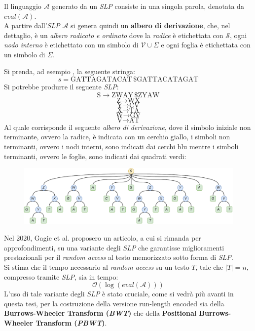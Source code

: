 Il linguaggio $\mathcal{A}$ generato da un \textit{SLP}
consiste in una singola parola, denotata da $eval(\mathcal{A})$. \\
A partire dall'\textit{SLP} $\mathcal{A}$ si genera quindi un \textbf{albero
  di derivazione}, che, nel dettaglio, è un \textit{albero radicato e ordinato}
dove la \textit{radice} è etichettata con $\mathcal{S}$, ogni \textit{nodo
  interno} è etichettato con un simbolo di $\mathcal{V}\cup\Sigma$ e ogni foglia
è etichettata con un simbolo di $\Sigma$.
\begin{esempio}
  \label{ese:slpgagie}
  Si prenda, ad esempio \cite{slpgagie}, la seguente stringa:
  \[s=\mbox{GATTAGATACAT}\,\$\mbox{GATTACATAGAT}\]
  Si potrebbe produrre il seguente \emph{SLP}:
  \[\mbox{S}\to \mbox{ZWAY}\,\$\mbox{ZYAW}\]
  \[\mbox{Z}\to \mbox{WX}\]
  \[\mbox{Y}\to \mbox{CV}\]
  \[\mbox{X}\to \mbox{TA}\]
  \[\mbox{W}\to \mbox{GV}\]
  \[\mbox{V}\to \mbox{AT}\]
  Al quale corrisponde il seguente \emph{albero di derivazione}, dove il simbolo
  iniziale non terminante, ovvero la radice, è indicata con un cerchio giallo, i
  simboli non terminanti, ovvero i nodi interni, sono indicati dai cerchi blu
  mentre i simboli terminanti, ovvero le foglie, sono indicati dai quadrati
  verdi:
  \begin{figure}[H]
    \centering
    \includegraphics[width=\textwidth]{img/slpgagie.pdf}
  \end{figure}
\end{esempio}
Nel 2020, Gagie et al. \cite{slpgagie} 
proposero un articolo, a cui si rimanda per approfondimenti, su una variante
degli \textit{SLP} che garantisse miglioramenti 
prestazionali per il \textit{random access} al testo memorizzato sotto forma di
\textit{SLP}.\\
Si stima che il tempo necessario al
\textit{random access} su un testo $T$, tale che $|T|=n$, compresso tramite
\textit{SLP}, sia in tempo:
\[\mathcal{O}\left(\log (eval(\mathcal{A}))\right)\]
L'uso di tale variante degli \textit{SLP} è stato cruciale, come si vedrà più
avanti in questa tesi, per la costruzione della versione run-length encoded sia
della \textbf{Burrows-Wheeler Transform (\textit{BWT})} che della
\textbf{Positional Burrows-Wheeler Transform (\textit{PBWT})}.
